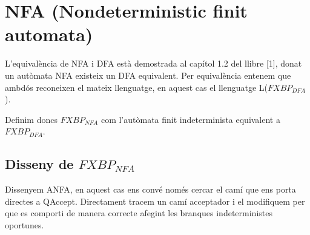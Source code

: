 \documentclass[12pt,a4paper]{report}
\def \dfa{$FXBP_{DFA} $}
\def \nfa{$FXBP_{NFA} $}
\begin{document}
\clearpage

\section{NFA (Nondeterministic finit automata)}

L’equivalència de NFA i DFA està demostrada al capítol 1.2 del llibre [1], donat un autòmata NFA existeix un DFA equivalent. Per equivalència entenem que ambdós reconeixen el mateix llenguatge, en aquest cas el llenguatge L(\dfa{}). 

Definim doncs \nfa{} com l’autòmata finit indeterminista equivalent a \dfa{}.

\subsection{Disseny de \nfa{}}

Dissenyem ANFA, en aquest cas ens convé només cercar el camí que ens porta directes a QAccept. Directament tracem un camí acceptador i el modifiquem per que es comporti de manera correcte afegint les branques indeterministes oportunes. 
\end{document}
